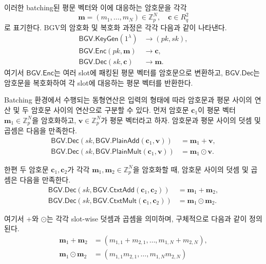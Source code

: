 \documentclass[sigconf,anonymous,review]{acmart}
\begin{document}
이러한 batching된 평문 벡터와 이에 대응하는 암호문을 각각
\[
\mathbf{m}=(m_1,\ldots,m_N)\in\mathbb{Z}_p^N,
\quad
\mathbf{c}\in R_q^2
\]
로 표기한다. BGV의 암호화 및 복호화 과정은 각각 다음과 같이
나타낸다.
\begin{align*}
\mathsf{BGV.KeyGen}(1^\lambda)
&\longrightarrow
(pk,sk),\\
\mathsf{BGV.Enc}(pk,\mathbf{m})
&\longrightarrow
\mathbf{c},\\
\mathsf{BGV.Dec}(sk,\mathbf{c})
&\longrightarrow
\mathbf{m}.
\end{align*}
여기서 \(\mathsf{BGV.Enc}\)는 여러 slot에 패킹된 평문 벡터를
암호문으로 변환하고, \(\mathsf{BGV.Dec}\)는 암호문을 복호화하여
각 slot에 대응하는 평문 벡터를 반환한다.

Batching 환경에서 수행되는 동형연산은 입력의 형태에 따라 암호문과
평문 사이의 연산 및 두 암호문 사이의 연산으로 구분할 수 있다.
먼저 암호문 \(\mathbf{c}_1\)이 평문 벡터
\(\mathbf{m}_1\in\mathbb{Z}_p^N\)을 암호화하고,
\(\mathbf{v}\in\mathbb{Z}_p^N\)가 평문 벡터라고 하자. 암호문과
평문 사이의 덧셈 및 곱셈은 다음을 만족한다.
\begin{align*}
    \mathsf{BGV.Dec}
    \left(
        sk,
        \mathsf{BGV.PlainAdd}(\mathbf{c}_1,\mathbf{v})
    \right)
    &=
    \mathbf{m}_1+\mathbf{v},\\
    \mathsf{BGV.Dec}
    \left(
        sk,
        \mathsf{BGV.PlainMult}(\mathbf{c}_1,\mathbf{v})
    \right)
    &=
    \mathbf{m}_1\odot\mathbf{v}.
\end{align*}

한편 두 암호문 \(\mathbf{c}_1,\mathbf{c}_2\)가 각각
\(\mathbf{m}_1,\mathbf{m}_2\in\mathbb{Z}_p^N\)을 암호화할 때,
암호문 사이의 덧셈 및 곱셈은 다음을 만족한다.
\begin{align*}
    \mathsf{BGV.Dec}
    \left(
        sk,
        \mathsf{BGV.CtxtAdd}(\mathbf{c}_1,\mathbf{c}_2)
    \right)
    &=
    \mathbf{m}_1+\mathbf{m}_2,\\
    \mathsf{BGV.Dec}
    \left(
        sk,
        \mathsf{BGV.CtxtMult}(\mathbf{c}_1,\mathbf{c}_2)
    \right)
    &=
    \mathbf{m}_1\odot\mathbf{m}_2.
\end{align*}

여기서 \(+\)와 \(\odot\)는 각각 slot-wise 덧셈과 곱셈을 의미하며,
구체적으로 다음과 같이 정의된다.
\begin{align*}
    \mathbf{m}_1+\mathbf{m}_2
    &=
    (m_{1,1}+m_{2,1},\ldots,m_{1,N}+m_{2,N}),\\
    \mathbf{m}_1\odot\mathbf{m}_2
    &=
    (m_{1,1}m_{2,1},\ldots,m_{1,N}m_{2,N})
\end{align*}
\end{document}
